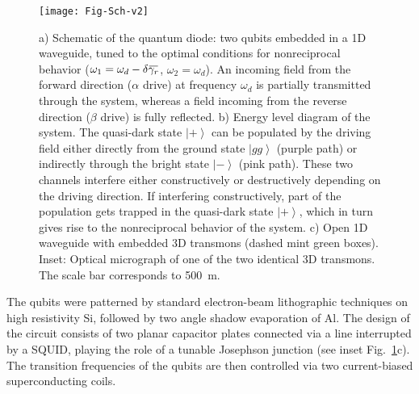 \documentclass[pra, twocolumn, amsmath, amssymb, notitlepage, longbibliography, showpacs, superscriptaddress]{revtex4-1}
\newcommand{\ket}[1]{\ensuremath{\left|#1\r\rangle}}
\renewcommand{\r}[0]{\right}
\newcommand{\overbar}[1]{\mkern 1.5mu\overline{\mkern-1.5mu#1\mkern-1.5mu}\mkern 1.5mu}
\begin{document}
\begin{figure}[t]
  \texttt{[image: Fig-Sch-v2]}
    \caption{a) Schematic of the quantum diode: two qubits embedded 
             in a 1D waveguide, tuned to the optimal conditions for nonreciprocal behavior 
             ($\omega_1=\omega_d-\delta\overbar{\gamma_r}$, $\omega_2=\omega_d$).  
             An incoming field from the forward direction ($\alpha$ drive)
             at frequency $\omega_d$ is partially transmitted through 
             the system, whereas a field incoming from the reverse direction ($\beta$ drive) 
             is fully reflected.
             b) Energy level diagram of the system. The quasi-dark state 
             $\ket{+}$ can be populated by the driving field either directly from the 
             ground state $\ket{gg}$ (purple path) or indirectly through the bright state 
             $\ket{-}$ (pink path). These two channels interfere either constructively 
             or destructively depending on the driving direction. If interfering constructively,
             part of the population gets trapped in the quasi-dark state $\ket{+}$,
             which in turn gives rise to the nonreciprocal behavior of the system.
             c) Open 1D waveguide with embedded 3D transmons (dashed mint green boxes). 
             Inset: Optical micrograph of one of the two identical 3D transmons.
             The scale bar corresponds to 500~\textmu m. }
	\label{FigSchematic}
\end{figure}

The qubits were patterned by standard electron-beam lithographic 
techniques on high resistivity Si, followed by two angle shadow evaporation of Al.
The design of the circuit consists of two planar capacitor plates connected 
via a line interrupted by a SQUID, playing the role of a tunable Josephson 
junction (see inset Fig.~\ref{FigSchematic}c). 
The transition frequencies of the qubits are then controlled 
via two current-biased superconducting coils. 
\end{document}
